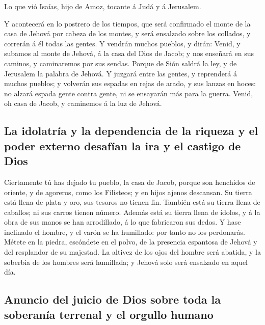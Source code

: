  Lo que vió Isaías, hijo de Amoz, tocante á Judá y á
Jerusalem.

 Y acontecerá en lo postrero de los tiempos, que será
confirmado el monte de la casa de Jehová por cabeza de los montes, y
será ensalzado sobre los collados, y correrán á él todas las gentes.
 Y vendrán muchos pueblos, y dirán: Venid, y subamos al
monte de Jehová, á la casa del Dios de Jacob; y nos enseñará en sus
caminos, y caminaremos por sus sendas. Porque de Sión saldrá la ley, y
de Jerusalem la palabra de Jehová.  Y juzgará entre las
gentes, y reprenderá á muchos pueblos; y volverán sus espadas en rejas
de arado, y sus lanzas en hoces: no alzará espada gente contra gente, ni
se ensayarán más para la guerra.  Venid, oh casa de Jacob, y
caminemos á la luz de Jehová.

\hypertarget{la-idolatruxeda-y-la-dependencia-de-la-riqueza-y-el-poder-externo-desafuxedan-la-ira-y-el-castigo-de-dios}{%
\subsection{La idolatría y la dependencia de la riqueza y el poder
externo desafían la ira y el castigo de
Dios}\label{la-idolatruxeda-y-la-dependencia-de-la-riqueza-y-el-poder-externo-desafuxedan-la-ira-y-el-castigo-de-dios}}

 Ciertamente tú has dejado tu pueblo, la casa de Jacob,
porque son henchidos de oriente, y de agoreros, como los Filisteos; y en
hijos ajenos descansan.  Su tierra está llena de plata y
oro, sus tesoros no tienen fin. También está su tierra llena de
caballos; ni sus carros tienen número.  Además está su
tierra llena de ídolos, y á la obra de sus manos se han arrodillado, á
lo que fabricaron sus dedos.  Y hase inclinado el hombre, y
el varón se ha humillado: por tanto no los perdonarás. 
Métete en la piedra, escóndete en el polvo, de la presencia espantosa de
Jehová y del resplandor de su majestad.  La altivez de los
ojos del hombre será abatida, y la soberbia de los hombres será
humillada; y Jehová solo será ensalzado en aquel día.

\hypertarget{anuncio-del-juicio-de-dios-sobre-toda-la-soberanuxeda-terrenal-y-el-orgullo-humano}{%
\subsection{Anuncio del juicio de Dios sobre toda la soberanía terrenal
y el orgullo
humano}\label{anuncio-del-juicio-de-dios-sobre-toda-la-soberanuxeda-terrenal-y-el-orgullo-humano}}

